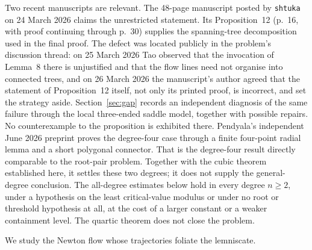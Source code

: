 \documentclass[11pt]{article}
\begin{document}
Two recent manuscripts are relevant.  The 48-page manuscript posted by
\texttt{shtuka} on 24 March 2026
\cite[Theorem~1, p.~1]{march2026} claims the unrestricted
statement.  Its Proposition~12 (p.~16, with proof continuing through p.~30)
supplies the spanning-tree decomposition used in the final proof.  The defect
was located publicly in the problem's discussion thread: on 25 March 2026 Tao
observed that the invocation of Lemma~8 there is unjustified and that the flow
lines need not organise into connected trees, and on 26 March 2026 the
manuscript's author agreed that the statement of Proposition~12 itself, not
only its printed proof, is incorrect, and set the strategy aside.  Section~\ref{sec:gap}
records an independent diagnosis of the same failure through the local
three-ended saddle model, together with possible repairs.  No counterexample
to the proposition is exhibited there.  Pendyala's independent June 2026
preprint \cite[Thm.~1, p.~1]{june2026} proves the degree-four case through a
finite four-point radial lemma and a short polygonal connector.  That is the
degree-four result directly comparable to the root-pair problem. Together
with the cubic theorem established here, it settles these two degrees; it
does not supply the general-degree conclusion. The all-degree estimates below hold in every degree
$n\ge2$, under a hypothesis on the least critical-value modulus or under no
root or threshold hypothesis at all, at the cost of a larger constant or a
weaker containment level.  The quartic theorem does
not close the problem.

We study the Newton flow whose trajectories foliate the lemniscate.

\statusboundary
\end{document}
